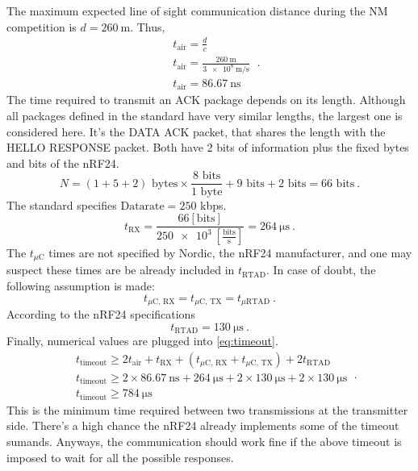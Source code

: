 The maximum expected line of sight communication distance during the NM competition is $d = \SI{260}{\m}$. Thus,
\begin{equation}
	\begin{split}
	& t_{\text{air}} = \frac{d}{c} \\
	& t_{\text{air}} = \frac{\SI{260}{\m}}{\SI{3e8}{\m\per\s}} \\
	& t_{\text{air}} = \SI{86.67}{\ns}
	\end{split} \ .
\end{equation}
The time required to transmit an ACK package depends on its length. Although all packages defined in the standard have very similar lengths, the largest one is considered here. It's the DATA ACK packet, that shares the length with the HELLO RESPONSE packet. Both have $2$ bits of information plus the fixed bytes and bits of the nRF24.
\begin{equation}
	N = \left( 1 + 5 + 2  \right)  \text{ bytes} \times \frac{8 \text{ bits}}{1 \text{ byte}} + 9 \text{ bits} + 2 \text{ bits} = 66 \text{ bits} \ .
\end{equation}
The standard specifies $\text{Datarate} = 250$ kbps.
\begin{equation}
	t_{\text{RX}} = \frac{66 \left[\text{bits} \right]}{ \SI{250e3}{} \left[\frac{\text{bits}}{\text{s}} \right]}  = \SI{264}{\us} \ .
\end{equation}
The $t_{\mu \text{C}}$ times are not specified by Nordic, the nRF24 manufacturer, and one may suspect these times are be already included in $t_{\text{RTAD}}$. In case of doubt, the following assumption is made:
\begin{equation}
	t_{\mu \text{C, RX}} = t_{\mu \text{C, TX}} = t_{\mu \text{RTAD}} \ .
\end{equation}
According to the nRF24 specifications
\begin{equation}  
	t_{\text{RTAD}} = \SI{130}{\us} \ .
\end{equation}
Finally, numerical values are plugged into \eqref{eq:timeout}.
\begin{equation}
	\begin{split}
	& t_{\text{timeout}} \geq 2 t_{\text{air}} + t_{\text{RX}} + \left(  t_{\mu \text{C, RX}} + t_{\mu \text{C, TX}} \right) +  2 t_{\text{RTAD}}  \\
	& t_{\text{timeout}} \geq 2 \times \SI{86.67}{\ns} + \SI{264}{\us} + 2 \times \SI{130}{\us} +  2 \times \SI{130}{\us} \\
	& t_{\text{timeout}} \geq  \SI{784}{\us}
	\end{split} \ .
\end{equation}
This is the minimum time required between two transmissions at the transmitter side. There's a high chance the nRF24 already implements some of the timeout sumands. Anyways, the communication should work fine if the above timeout is imposed to wait for all the possible responses.

















